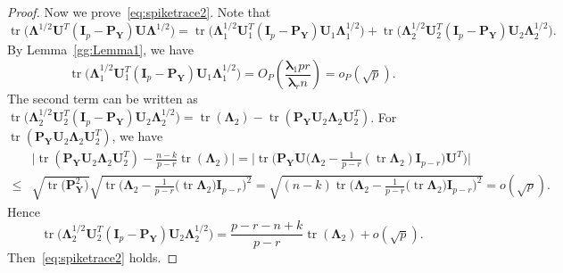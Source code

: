 \documentclass[12pt]{article} %
\DeclareMathOperator{\mytr}{tr}
\newcommand{\bP}{\mathbf{P}}
\newcommand{\bY}{\mathbf{Y}}
\newcommand{\bI}{\mathbf{I}}
\newcommand{\bU}{\mathbf{U}}
\newcommand{\bfsym}[1]{\ensuremath{\boldsymbol{#1}}}
\def\blambda {\bfsym {\lambda}}
\def\bLambda {\bfsym {\Lambda}}
\theoremstyle{definition}
\begin{document}
\begin{proof}
    Now we prove~\eqref{eq:spiketrace2}. Note that
    $$
\mytr\big(\bLambda^{1/2} \bU^T (\bI_p-\bP_{\bY})\bU \bLambda^{1/2}\big)
=
\mytr\big(\bLambda_1^{1/2} \bU_1^T (\bI_p-\bP_{\bY})\bU_1 \bLambda_1^{1/2}\big)
+
\mytr\big(\bLambda_2^{1/2} \bU_2^T (\bI_p-\bP_{\bY})\bU_2 \bLambda_2^{1/2}\big).
    $$
    By Lemma~\ref{gg:Lemma1}, we have 
    $$\mytr\big(\bLambda_1^{1/2} \bU_1^T (\bI_p-\bP_{\bY})\bU_1 \bLambda_1^{1/2}\big)=O_P(\frac{\blambda_1 p r}{\blambda_r n})=o_P(\sqrt{p}).$$
    The second term can be written as
    $
    \mytr\big(\bLambda_2^{1/2} \bU_2^T (\bI_p-\bP_{\bY})\bU_2 \bLambda_2^{1/2}\big)
    =
    \mytr(\bLambda_2)-\mytr(\bP_{\bY}\bU_2\bLambda_2 \bU_2^T)
    $.
    For $\mytr(\bP_{\bY}\bU_2\bLambda_2 \bU_2^T)$, we have
    $$
    \begin{aligned}
        &
        \big|
    \mytr(\bP_{\bY}\bU_2\bLambda_2 \bU_2^T)
    -\frac{n-k}{p-r}\mytr(\bLambda_2)
    \big|
    =
    \Big|
        \mytr\Big(\bP_{\bY} \bU \big(\bLambda_2-\frac{1}{p-r} (\mytr \bLambda_2) \bI_{p-r} \big) \bU^T\Big)
    \Big|
        \\
        \leq &
        \sqrt{\mytr \big(\bP_{\bY}^2\big)}
        \sqrt{\mytr \Big(\bLambda_2-\frac{1}{p-r}\big(\mytr \bLambda_2\big) \bI_{p-r}\Big)^2}
        =\sqrt{(n-k)\mytr \Big(\bLambda_2-\frac{1}{p-r}\big(\mytr \bLambda_2\big) \bI_{p-r}\Big)^2}
        =o(\sqrt{p}).
    \end{aligned}
    $$
    Hence 
    $$
    \mytr\big(\bLambda_2^{1/2} \bU_2^T (\bI_p-\bP_{\bY})\bU_2 \bLambda_2^{1/2}\big)
    =
    \frac{p-r-n+k}{p-r}\mytr(\bLambda_2)+o(\sqrt{p}).
    $$
    Then~\eqref{eq:spiketrace2} holds.
\end{proof}
\end{document}
